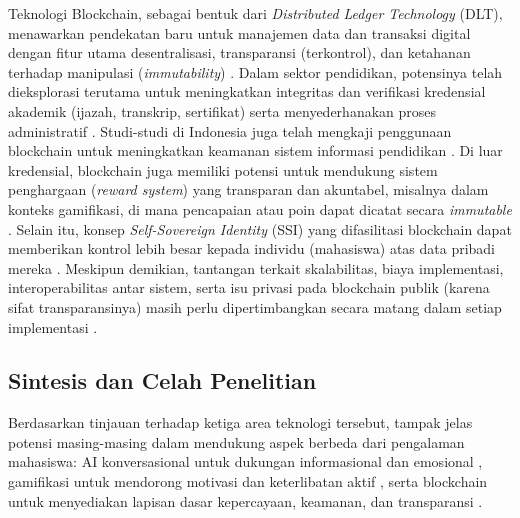 Teknologi Blockchain, sebagai bentuk dari \textit{Distributed Ledger Technology} (DLT), menawarkan pendekatan baru untuk manajemen data dan transaksi digital dengan fitur utama desentralisasi, transparansi (terkontrol), dan ketahanan terhadap manipulasi (\textit{immutability}) \cite{blockchain_security_privacy_education_2020}. Dalam sektor pendidikan, potensinya telah dieksplorasi terutama untuk meningkatkan integritas dan verifikasi kredensial akademik (ijazah, transkrip, sertifikat) serta menyederhanakan proses administratif \cite{blockchain_education_transforming_2024}. Studi-studi di Indonesia juga telah mengkaji penggunaan blockchain untuk meningkatkan keamanan sistem informasi pendidikan \cite{blockchain_security_education_rizky_2021}. Di luar kredensial, blockchain juga memiliki potensi untuk mendukung sistem penghargaan (\textit{reward system}) yang transparan dan akuntabel, misalnya dalam konteks gamifikasi, di mana pencapaian atau poin dapat dicatat secara \textit{immutable} \cite{integrated_metaverse_blockchain_ai_education_2025}. Selain itu, konsep \textit{Self-Sovereign Identity} (SSI) yang difasilitasi blockchain dapat memberikan kontrol lebih besar kepada individu (mahasiswa) atas data pribadi mereka \cite{survey_blockchain_privacy_2024}. Meskipun demikian, tantangan terkait skalabilitas, biaya implementasi, interoperabilitas antar sistem, serta isu privasi pada blockchain publik (karena sifat transparansinya) masih perlu dipertimbangkan secara matang dalam setiap implementasi \cite{survey_blockchain_privacy_2024, blockchain_security_privacy_education_2020}.

\subsection{Sintesis dan Celah Penelitian}
\label{subsec:sintesis_celah}

Berdasarkan tinjauan terhadap ketiga area teknologi tersebut, tampak jelas potensi masing-masing dalam mendukung aspek berbeda dari pengalaman mahasiswa: AI konversasional untuk dukungan informasional dan emosional \cite{empathetic_conversational_agents_mental_health_2024, chatbot_student_mental_health_unuja}, gamifikasi untuk mendorong motivasi dan keterlibatan aktif \cite{gamification_higher_ed_review_2023, gamification_engagement_moderating_concentration_2024}, serta blockchain untuk menyediakan lapisan dasar kepercayaan, keamanan, dan transparansi \cite{blockchain_education_transforming_2024, blockchain_security_privacy_education_2020}.


